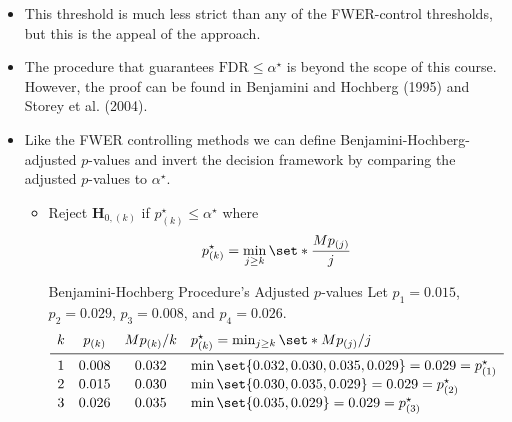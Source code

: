 \begin{itemize}
\begin{figure}[!htbp]
                  \caption{Significance Thresholds for Several Methods of Correction (2).}\label{fig:pvsrank2}
            \end{figure}
            \begin{Example}{Four-test Example --- Benjamini-Hochberg Procedure}{}
                  Let $ p_1=0.015 $, $ p_2=0.029 $, $ p_3=0.008 $, and $ p_4=0.026 $. Suppose that we wish to ensure
                  $ \FWER\le \alpha^\star=0.05 $. Since all $ p $-values fall below the purple line in~,
                  we reject all four null hypotheses.
            \end{Example}
      \item This threshold is much less strict than any of the FWER-control thresholds, but this is the appeal of
            the approach.
      \item The procedure that guarantees $ \text{FDR}\le \alpha^\star $ is beyond the scope of this course.
            However, the proof can be found in Benjamini and Hochberg (1995) and Storey et al. (2004).
      \item Like the FWER controlling methods we can define Benjamini-Hochberg-adjusted $p$-values and invert
            the decision framework by comparing the adjusted $ p $-values to $ \alpha^\star $.
            \begin{itemize}
                  \item Reject $ \mathbf{H}_{0,(k)} $ if $ p_{(k)}^\star\le \alpha^\star $ where
                        \[ p_{(k)}^\star=\min_{j\ge k}\set*{\frac{Mp_{(j)}}{j}} \]
                        \begin{Example}{Benjamini-Hochberg Procedure's Adjusted $ p $-values}{}
                              Let $ p_1=0.015 $, $ p_2=0.029 $, $ p_3=0.008 $, and $ p_4=0.026 $.
                              \[ \begin{array}{cccl}
                                          k & p_{(k)} & M p_{(k)}/k & p_{(k)}^\star=\min_{j\ge k}\set*{Mp_{(j)}/j}          \\
                                          \midrule
                                          1 & 0.008   & 0.032       & \min\set{0.032,0.030,0.035,0.029}=0.029=p_{(1)}^\star \\
                                          2 & 0.015   & 0.030       & \min\set{0.030,0.035,0.029}=0.029=p_{(2)}^\star       \\
                                          3 & 0.026   & 0.035       & \min\set{0.035,0.029}=0.029=p_{(3)}^\star             \\

\end{array}\]
\end{Example}
\end{itemize}
\end{itemize}

